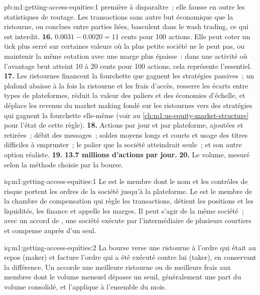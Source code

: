 \begin{solution}{pb:m1:getting-access-equities:1}
première à disparaître~; elle fausse en outre les statistiques de routage. Les transactions sans
autre but économique que la ristourne, ou conclues entre parties liées, basculent
dans le wash trading, ce qui est interdit.
\textbf{16.} $0.0031 - 0.0020 = 11$ cents pour 100 actions. Elle peut coter un tick plus serré
sur certaines valeurs où la plus petite société ne le peut pas, ou maintenir la même cotation
avec une marge plus épaisse~: dans une activité où l'avantage brut atteint 10 à 20 cents pour
100 actions, cela représente l'essentiel.
\textbf{17.} Les ristournes financent la fourchette que gagnent les stratégies passives~; un plafond
abaisse à la fois la ristourne et les frais d'accès, resserre les écarts
entre types de plateformes, réduit la valeur des paliers et des économies d'échelle, et déplace
les revenus du market making fondé sur les ristournes vers des stratégies qui gagnent la fourchette
elle-même (voir au \cref{ch:m1:us-equity-market-structure} pour l'état de cette
règle).
\textbf{18.} Actions par jour et par plateforme, ajoutées et retirées~; débit des messages~;
soldes moyens longs et courts et usage des titres difficiles à emprunter~; le palier que
la société atteindrait seule~; et son autre option réaliste.
\textbf{19.} \textbf{13.7 millions d'actions par jour.}
\textbf{20.} Le volume, mesuré selon la méthode choisie par la bourse.
\end{solution}

\begin{solution}{iq:m1:getting-access-equities:1}
Le  est le membre dont le nom et les contrôles de risque portent les
ordres de la société jusqu'à la plateforme. Le  est le membre de la
chambre de compensation qui règle les transactions, détient les positions et les liquidités,
les finance et appelle les marges. Il peut s'agir de la même société~; avec un accord de
, une société exécute par l'intermédiaire de plusieurs courtiers et compense auprès d'un seul.
\end{solution}

\begin{solution}{iq:m1:getting-access-equities:2}
La bourse verse une ristourne à l'ordre qui était au repos (maker) et
facture l'ordre qui a été exécuté contre lui (taker), en conservant la différence.
Un  accorde une meilleure ristourne ou de meilleurs frais aux membres dont le volume mensuel
dépasse un seuil, généralement une part du volume consolidé, et l'applique à
l'ensemble du mois.
\end{solution}

